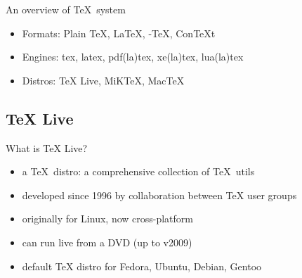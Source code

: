 \documentclass{beamer}
\def\TeXLive{\TeX{} Live\xspace}
\let\TL=\TeXLive
\begin{document}
%

\begin{frame}{An overview of \TeX\ system}
  \begin{itemize}
    \item Formats: Plain \TeX, \LaTeX, \AmS-\TeX, Con\TeX{}t
    \item Engines: tex, latex, pdf(la)tex, xe(la)tex, lua(la)tex
      \pause
    \item Distros: \TL, MiK\TeX, Mac\TeX
  \end{itemize}
\end{frame}

\subsection{\TeXLive}

\begin{frame}{What is \TL ?}
  \begin{itemize}
    \item a \TeX\ distro: a comprehensive collection of \TeX\ utils
    \item developed since 1996 by collaboration between TeX user groups
    \item originally for Linux, now cross-platform
    \item can run live from a DVD (up to v2009)
    \item default TeX distro for Fedora, Ubuntu, Debian, Gentoo
  \end{itemize}
\end{frame}
\end{document}
